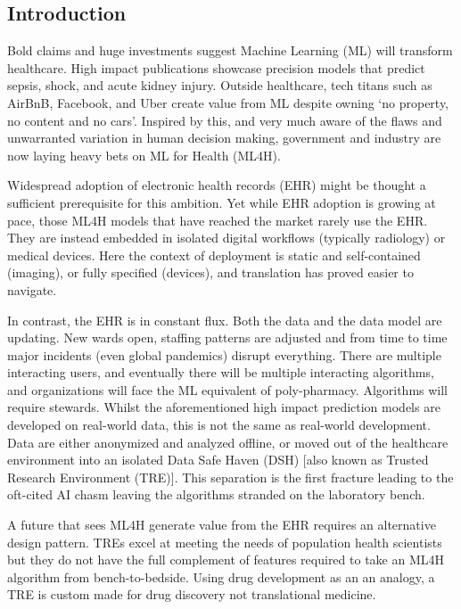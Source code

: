 \hypertarget{introduction}{%
\subsection{Introduction}\label{introduction}}

Bold claims and huge investments suggest Machine Learning (ML) will
transform healthcare.\citep{bunz2022a} High impact publications showcase
precision models that predict sepsis, shock, and acute kidney
injury.\citep{komorowski2018, hyland2020, tomasev2019} Outside
healthcare, tech titans such as AirBnB, Facebook, and Uber create value
from ML despite owning `no property, no content and no
cars'.\citep{mcrae2015} Inspired by this, and very much aware of the
flaws and unwarranted variation in human decision
making\citep{braithwaite2020}, government and industry are now laying
heavy bets on ML for Health (ML4H).\citep{nhsx2022, 2021f}

Widespread adoption of electronic health records (EHR) might be thought
a sufficient prerequisite for this ambition. Yet while EHR adoption is
growing at pace\citep{everson2020}, those ML4H models that have reached
the market rarely use the EHR. They are instead embedded in isolated
digital workflows (typically radiology) or medical
devices.\citep{muehlematter2021} Here the context of deployment is
static and self-contained (imaging), or fully specified (devices), and
translation has proved easier to navigate.

In contrast, the EHR is in constant flux. Both the data and the data
model are updating. New wards open, staffing patterns are adjusted and
from time to time major incidents (even global pandemics) disrupt
everything. There are multiple interacting users, and eventually there
will be multiple interacting algorithms, and organizations will face the
ML equivalent of poly-pharmacy.\citep{morse2020a} Algorithms will
require stewards.\citep{eaneff2020} Whilst the aforementioned high
impact prediction models are developed on real-world data, this is not
the same as real-world development. Data are either anonymized and
analyzed offline, or moved out of the healthcare environment into an
isolated Data Safe Haven (DSH) {[}also known as Trusted Research
Environment (TRE){]}.\citep{burton2015} This separation is the first
fracture leading to the oft-cited AI chasm\citep{keane2018} leaving the
algorithms stranded on the laboratory bench.

A future that sees ML4H generate value from the EHR requires an
alternative design pattern. TREs excel at meeting the needs of
population health scientists but they do not have the full complement of
features required to take an ML4H algorithm from bench-to-bedside. Using
drug development as an an analogy, a TRE is custom made for drug
discovery not translational medicine.\citep{woolf2008b}

